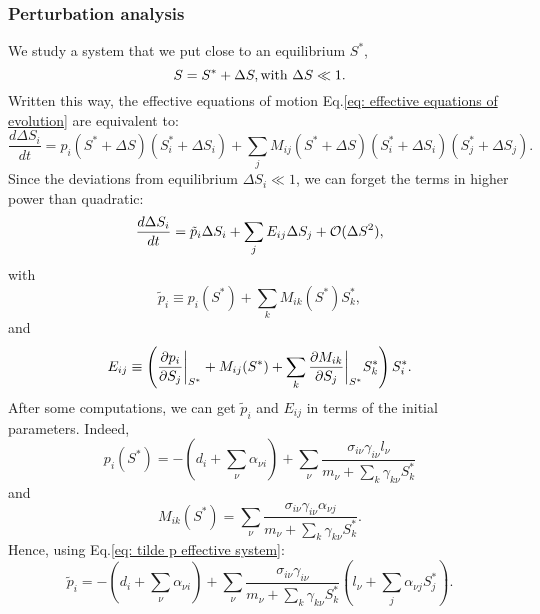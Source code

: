 \documentclass[12pt]{report}
\begin{document}
\subsubsection{Perturbation analysis}
We study a system that we put close to an equilibrium $S^*$, \ie
\begin{equation}
S=S^*+\Delta S, \\ \text{with } \Delta S \ll 1.
\end{equation}
Written this way, the effective equations of motion Eq.\eqref{eq: effective equations of evolution} are equivalent to:
\begin{equation}
\frac{d\Delta S_i}{dt} = p_i(S^*+\Delta S)\left(S^*_i + \Delta S_i\right)+\sum_j M_{ij}(S^*+\Delta S)\left(S^*_i +\Delta S_i\right)\left(S^*_j +\Delta S_j\right).
\end{equation}
Since the deviations from equilibrium $\Delta S_i \ll 1$, we can forget the terms in higher power than quadratic:
\begin{equation}
\frac{d\Delta S_i}{dt} = \tilde{p}_i \Delta S_i + \sum_j E_{ij} \Delta S_j + \mathcal{O}(\Delta S^2),\label{eq: effective equ evol at O(D2)}
\end{equation}
with
\begin{equation}
\tilde{p}_i \equiv p_i(S^*) + \sum_k M_{ik}(S^*)S_k^*, \label{eq: tilde p effective system}
\end{equation}
and
\begin{equation}
E_{ij} \equiv \left(\dfrac{\partial p_i}{\partial S_j}\bigg\rvert_{S^*}+M_{ij}(S^*)+\sum_k \dfrac{\partial M_{ik}}{\partial S_j}\bigg\rvert_{S^*}S^*_k\right)S^*_i.
\end{equation}
After some computations, we can get $\tilde{p}_i$ and $E_{ij}$ in terms of the initial parameters. Indeed,
\begin{equation}
p_i(S^*)= -\left(d_i + \sum_\nu \alpha_{\nu i}\right) + \sum_\nu \frac{\sigma_{i\nu}\gamma_{i\nu}l_\nu}{m_\nu + \sum_k \gamma_{k\nu}S^*_k}
\end{equation}
and
\begin{equation}
M_{ik}(S^*) = \sum_\nu \frac{\sigma_{i\nu}\gamma_{i\nu}\alpha_{\nu j}}{m_\nu + \sum_k \gamma_{k\nu}S^*_k}.
\end{equation}
Hence, using Eq.\eqref{eq: tilde p effective system}:
\begin{equation}
\tilde{p}_i = - \left(d_i + \sum_\nu \alpha_{\nu i}\right) + \sum_\nu \frac{\sigma_{i\nu}\gamma_{i\nu}}{m_\nu + \sum_k \gamma_{k\nu}S^*_k}\left(l_\nu+\sum_{j}\alpha_{\nu j} S^*_j\right).
\end{equation}
\end{document}
